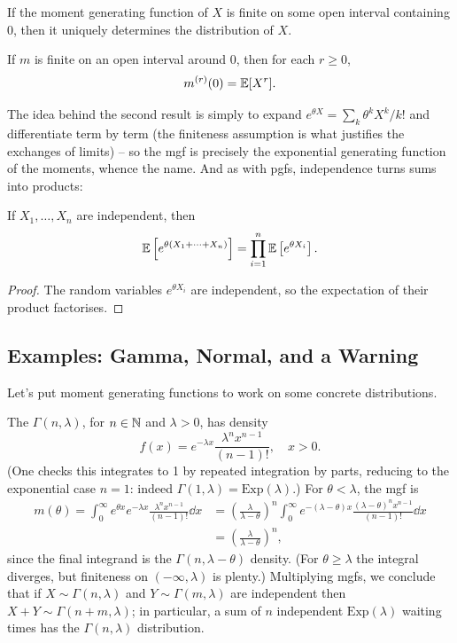 \documentclass[a4paper]{scrartcl}
\begin{document}
\begin{theorem}[Uniqueness]
	If the moment generating function of $X$ is finite on some open interval containing $0$, then it uniquely determines the distribution of $X$.
\end{theorem}

\begin{theorem}
	If $m$ is finite on an open interval around $0$, then for each $r \geq 0$,
	$$
	m^{(r)}(0) = \mathbb{E}[X^r].
	$$
\end{theorem}

The idea behind the second result is simply to expand $e^{\theta X} = \sum_k \theta^k X^k / k!$ and differentiate term by term (the finiteness assumption is what justifies the exchanges of limits) -- so the mgf is precisely the exponential generating function of the moments, whence the name. And as with pgfs, independence turns sums into products:

\begin{theorem}
	If $X_1, \dots, X_n$ are independent, then
	$$
	\mathbb{E}\left[e^{\theta(X_1 + \cdots + X_n)}\right] = \prod_{i = 1}^{n} \mathbb{E}\left[e^{\theta X_i}\right].
	$$
\end{theorem}
\begin{proof}
	The random variables $e^{\theta X_i}$ are independent, so the expectation of their product factorises.
\end{proof}

\subsection{Examples: Gamma, Normal, and a Warning}

Let's put moment generating functions to work on some concrete distributions.

\begin{example}
	The  $\Gamma(n, \lambda)$, for $n \in \mathbb{N}$ and $\lambda > 0$, has density
	$$
	f(x) = e^{-\lambda x}\frac{\lambda^n x^{n - 1}}{(n-1)!}, \quad x > 0.
	$$
	(One checks this integrates to 1 by repeated integration by parts, reducing to the exponential case $n = 1$: indeed $\Gamma(1, \lambda) = \mathrm{Exp}(\lambda)$.) For $\theta < \lambda$, the mgf is
	\begin{align*}
		m(\theta) = \int_0^{\infty} e^{\theta x}e^{-\lambda x}\frac{\lambda^n x^{n-1}}{(n-1)!}\dd x &= \left(\frac{\lambda}{\lambda - \theta}\right)^n \int_0^{\infty} e^{-(\lambda - \theta)x}\frac{(\lambda - \theta)^n x^{n - 1}}{(n-1)!}\dd x \\
		&= \left(\frac{\lambda}{\lambda - \theta}\right)^n,
	\end{align*}
	since the final integrand is the $\Gamma(n, \lambda - \theta)$ density. (For $\theta \geq \lambda$ the integral diverges, but finiteness on $(-\infty, \lambda)$ is plenty.) Multiplying mgfs, we conclude that if $X \sim \Gamma(n, \lambda)$ and $Y \sim \Gamma(m, \lambda)$ are independent then $X + Y \sim \Gamma(n + m, \lambda)$; in particular, a sum of $n$ independent $\mathrm{Exp}(\lambda)$ waiting times has the $\Gamma(n, \lambda)$ distribution.
\end{example}
\end{document}
